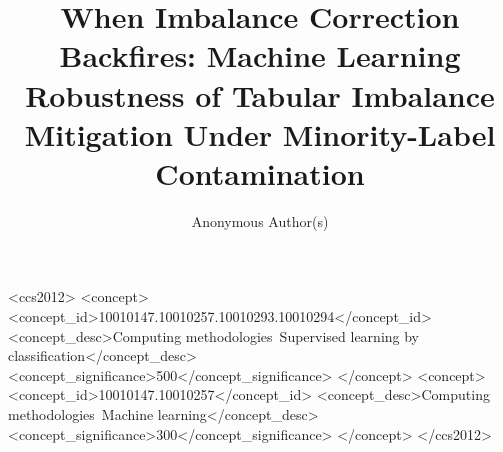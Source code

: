 \documentclass[acmsmall,screen,anonymous,review]{acmart}
\begin{document}
\title{When Imbalance Correction Backfires: Machine Learning Robustness of Tabular
Imbalance Mitigation Under Minority-Label Contamination}

\author{Anonymous Author(s)}

\renewcommand{\shortauthors}{Anonymous et al.}

\begin{abstract}

\end{abstract}

\begin{CCSXML}
<ccs2012>
<concept>
<concept_id>10010147.10010257.10010293.10010294</concept_id>
<concept_desc>Computing methodologies~Supervised learning by classification</concept_desc>
<concept_significance>500</concept_significance>
</concept>
<concept>
<concept_id>10010147.10010257</concept_id>
<concept_desc>Computing methodologies~Machine learning</concept_desc>
<concept_significance>300</concept_significance>
</concept>
</ccs2012>
\end{CCSXML}



\maketitle










\end{document}
